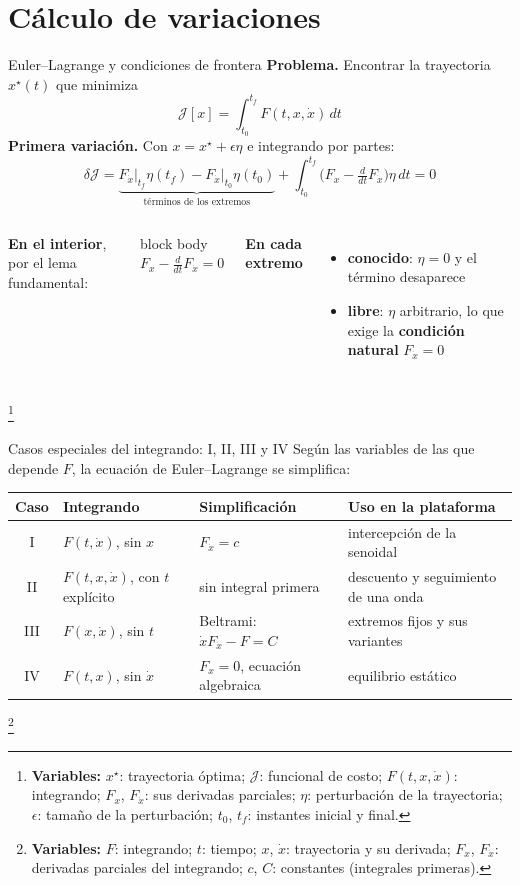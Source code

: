 \documentclass[aspectratio=169,10pt]{beamer}
\newcommand{\variables}[1]{\begingroup\renewcommand{\thefootnote}{}\footnote[frame]{\textbf{Variables:} #1}\addtocounter{footnote}{-1}\endgroup}
\newcommand{\resultado}[1]{\par\smallskip\begin{beamercolorbox}[rounded=true,sep=0.45em,center]{block body}#1\end{beamercolorbox}\par\smallskip}
\begin{document}
\section{Cálculo de variaciones}

\begin{frame}{Euler--Lagrange y condiciones de frontera}
\small
\textbf{Problema.} Encontrar la trayectoria $x^\star(t)$ que minimiza
\[
\mathcal J[x] = \int_{t_0}^{t_f}F(t, x, \dot x)\,dt
\]
\textbf{Primera variación.} Con $x = x^\star + \epsilon\eta$ e integrando por partes:
\[
\delta\mathcal J = \underbrace{F_{\dot x}\big|_{t_f}\eta(t_f) - F_{\dot x}\big|_{t_0}\eta(t_0)}_{\text{términos de los extremos}} + \int_{t_0}^{t_f}\Big(F_x - \tfrac{d}{dt}F_{\dot x}\Big)\eta\,dt = 0
\]
\begin{columns}[T]
\textbf{En el interior}, por el lema fundamental:
\resultado{$\displaystyle F_x - \frac{d}{dt}F_{\dot x} = 0$}
\textbf{En cada extremo}
\begin{itemize}
\setlength{\itemsep}{0.3em}
\item \textbf{conocido}: $\eta = 0$ y el término desaparece
\item \textbf{libre}: $\eta$ arbitrario, lo que exige la \textbf{condición natural} $F_{\dot x} = 0$
\end{itemize}
\end{columns}
\variables{$x^\star$: trayectoria óptima; $\mathcal J$: funcional de costo; $F(t, x, \dot x)$: integrando; $F_x$, $F_{\dot x}$: sus derivadas parciales; $\eta$: perturbación de la trayectoria; $\epsilon$: tamaño de la perturbación; $t_0$, $t_f$: instantes inicial y final.}
\end{frame}

\begin{frame}{Casos especiales del integrando: I, II, III y IV}
\small
Según las variables de las que depende $F$, la ecuación de Euler--Lagrange se simplifica:
\begin{center}
\footnotesize
\renewcommand{\arraystretch}{1.55}
\begin{tabular}{@{}clll@{}}
\toprule
Caso & Integrando & Simplificación & Uso en la plataforma \\
\midrule
I & $F(t, \dot x)$, sin $x$ & $F_{\dot x} = c$ & intercepción de la senoidal \\
II & $F(t, x, \dot x)$, con $t$ explícito & sin integral primera & descuento y seguimiento de una onda \\
III & $F(x, \dot x)$, sin $t$ & Beltrami: $\dot xF_{\dot x} - F = C$ & extremos fijos y sus variantes \\
IV & $F(t, x)$, sin $\dot x$ & $F_x = 0$, ecuación algebraica & equilibrio estático \\
\bottomrule
\end{tabular}
\end{center}
\variables{$F$: integrando; $t$: tiempo; $x$, $\dot x$: trayectoria y su derivada; $F_x$, $F_{\dot x}$: derivadas parciales del integrando; $c$, $C$: constantes (integrales primeras).}
\end{frame}
\end{document}
